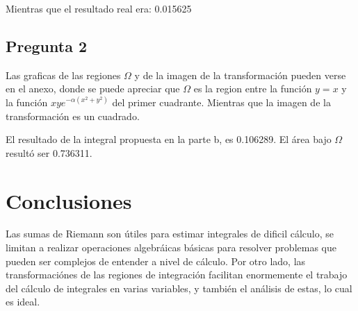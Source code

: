 \documentclass[12pt,letterpaper]{article}
\begin{document}
Mientras que el resultado real era: 0.015625

\subsection{Pregunta 2}
Las graficas de las regiones $\Omega$ y de la imagen de la transformación pueden verse en el anexo, donde se puede apreciar que $\Omega$ es la region entre la función $y=x$ y la función $xye^{-\alpha(x^2+y^2)}$ del primer cuadrante. Mientras que la imagen de la transformación es un cuadrado.

El resultado de la integral propuesta en la parte b, es 0.106289. El área bajo $\Omega$ resultó ser 0.736311.

\section{Conclusiones}
Las sumas de Riemann son útiles para estimar integrales de dificil cálculo, se limitan a realizar operaciones algebráicas básicas para resolver problemas que pueden ser complejos de entender a nivel de cálculo.
Por otro lado, las transformaciónes de las regiones de integración facilitan enormemente el trabajo del cálculo de integrales en varias variables, y también el análisis de estas, lo cual es ideal.


\end{document}
